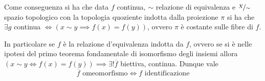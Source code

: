 	\begin{minipage}[t]{0.83\textwidth}
		Come conseguenza si ha che data $f$ continua, $\sim$ relazione di equivalenza e $\nicefrac{X}{\sim}$ spazio topologico con la topologia quoziente indotta dalla proiezione $\pi$ si ha che $\exists g$ continua $\iff \left( x\sim y \implies f(x)=f(y) \right)$, ovvero $\pi$ è costante sulle fibre di $f$.
	 	\end{minipage}
 	\begin{minipage}[t]{0.13\textwidth}\vspace{-10pt}
	\end{minipage}
	\begin{minipage}[t]{0.83\textwidth}
		In particolare se $f$ è la relazione d'equivalenza indotta da $f$, ovvero se si è nelle ipotesi del primo teorema fondamentale di isomorfismo degli insiemi allora $\left( x\sim y \iff f(x)=f(y) \right) \implies \exists ! \overline{f}$ biettiva, continua. Dunque vale 
			\begin{equation}
				\overline{f} \text{ omeomorfismo} \iff f \text{ identificazione}
			\end{equation}
	 	\end{minipage}
		\begin{minipage}[t]{0.13\textwidth}\vspace{-10pt}
		\end{minipage}\\
	
